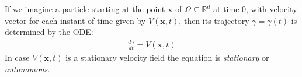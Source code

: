 If we imagine a particle starting at the point $\mathbf{x}$ of $\Omega \subseteq \mathbb{R}^{d}$ at time $0$, with velocity vector for each instant of time given by $V(\mathbf{x},t)$, then its trajectory $\gamma = \gamma(t)$ is determined by the ODE:
\begin{align*}
\frac{d\gamma}{dt} = V(\mathbf{x},t)
\end{align*}
In case $V(\mathbf{x},t)$ is a stationary velocity field the equation is \emph{stationary} or \emph{autonomous}.


